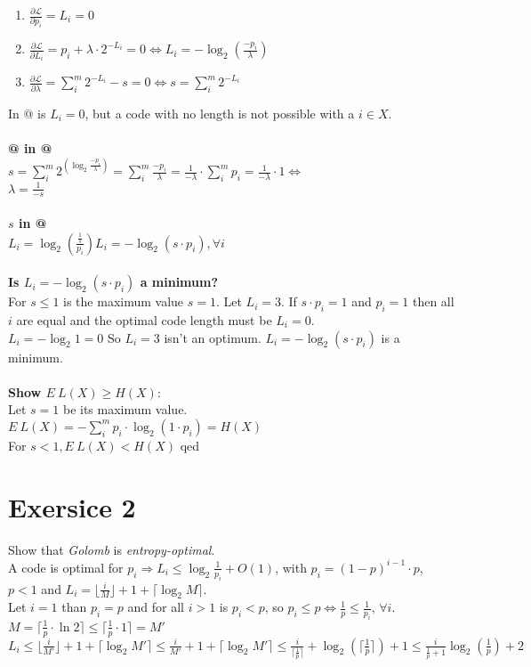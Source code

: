 \documentclass[a4paper,
  twoside, %
  headlines=2.1 %
  ]{scrartcl}
\makeatletter
\newcommand*{\rom}[1]{\expandafter\@slowromancap\romannumeral #1@}
\makeatother
\begin{document}
\begin{enumerate}[label=\Roman*, itemsep=-1em]
    \item $\frac{\partial \mathcal{L}}{\partial p_i} = L_i  = 0$\\
    \item $\frac{\partial \mathcal{L}}{\partial L_i} = p_i + \lambda \cdot 2^{-L_i}= 0 \iff L_i = - \log_2 (\frac{-p_i}{\lambda})$\\
    \item $\frac{\partial \mathcal{L}}{\partial \lambda} = \sum_i^m 2^{-L_i} - s = 0 \iff s = \sum_i^m 2^{-L_i}$
\end{enumerate}
In \rom{1} is $L_i = 0$, but a code with no length is not possible with a $i \in X$.\\
\\
\textbf{\rom{2} in \rom{3}}\\
$s = \sum_i^m 2^{(\log_2 \frac{-p_i}{\lambda})} = \sum_i^m \frac{-p_i}{\lambda} =  \frac{1}{-\lambda} \cdot \sum_i^m p_i = \frac{1}{-\lambda} \cdot 1 \iff$\\
$\lambda = \frac{1}{-s}$\\
\\
\textbf{$s$ in \rom{2}}\\
$L_i = \log_2 (\frac{\frac{1}{s}}{p_i}) L_i = - \log_2 (s \cdot p_i), \forall i$\\
\\
\textbf{Is $L_i = -\log_2 (s \cdot p_i)$ a minimum?}\\
For $s \leq 1$ is the maximum value $s = 1$. Let $L_i = 3$. If $s \cdot p_i = 1$ and $p_i = 1$ then all $i$ are equal and the optimal code length must be $L_i = 0$.\\
$L_i = -\log_2 1 = 0$ So $L_i = 3$ isn't an optimum.
$L_i = -\log_2 (s \cdot p_i)$ is a minimum.\\
\\
\textbf{Show $E\ L(X) \geq H(X)$}:\\
Let $s=1$ be its maximum value.\\
$E\ L(X) = - \sum_i^m p_i \cdot \log_2 (1 \cdot p_i) = H(X)$\\
For $s<1, E\ L(X) < H(X)$ qed

\section*{Exersice 2}
Show that \textit{Golomb} is \textit{entropy-optimal}.\\
A code is optimal for $p_i \Rightarrow L_i \leq \log_2 \frac{1}{p_i} + O(1)$, with $p_i = (1-p)^{i-1} \cdot p$, $p < 1$ and $L_i = \lfloor \frac{i}{M} \rfloor + 1 + \lceil \log_2 M \rceil$.\\
Let $i = 1$ than $p_i = p$ and for all $i >1$ is $p_i < p$, so $p_i \leq p \iff \frac{1}{p} \leq \frac{1}{p_i}$, $\forall i$.\\
$M = \lceil \frac{1}{p} \cdot \ln 2 \rceil \leq \lceil \frac{1}{p} \cdot 1 \rceil  = M'$ \\
$L_i \leq \lfloor \frac{i}{M'} \rfloor + 1 + \lceil \log_2 M' \rceil \leq \frac{i}{M'} + 1 + \lceil \log_2 M' \rceil \leq \frac{i}{\lceil \frac{1}{p} \rceil} + \log_2 (\lceil \frac{1}{p} \rceil) + 1 \leq \frac{i}{\frac{1}{p} + 1}\log_2 (\frac{1}{p}) + 2$\\
\end{document}
